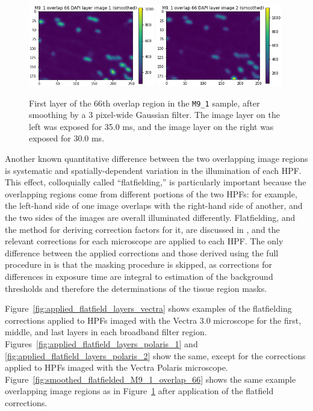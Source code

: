 \documentclass[letterpaper,11pt]{article}
\newcommand{\reffig}[1]{Figure~\ref{#1}}
\begin{document}
\begin{figure}[!ht]
\centering
\includegraphics[width=0.49\textwidth]{images/methods/smoothed_M9_1_overlap_66_dapi_image_1}
\includegraphics[width=0.49\textwidth]{images/methods/smoothed_M9_1_overlap_66_dapi_image_2}
\caption{\footnotesize First layer of the 66th overlap region in the \texttt{M9\_1} sample, after smoothing by a 3 pixel-wide Gaussian filter. The image layer on the left was exposed for 35.0 ms, and the image layer on the right was exposed for 30.0 ms.}
\label{fig:smoothed_M9_1_overlap_66}
\end{figure}

Another known quantitative difference between the two overlapping image regions is systematic and spatially-dependent variation in the illumination of each HPF. This effect, colloquially called ``flatfielding,'' is particularly important because the overlapping regions come from different portions of the two HPFs: for example, the left-hand side of one image overlaps with the right-hand side of another, and the two sides of the images are overall illuminated differently. Flatfielding, and the method for deriving correction factors for it, are discussed in \cite{flatfielding_note}, and the relevant corrections for each microscope are applied to each HPF. The only difference between the applied corrections and those derived using the full procedure in \cite{flatfielding_note} is that the masking procedure is skipped, as corrections for differences in exposure time are integral to estimation of the background thresholds and therefore the determinations of the tissue region masks. 

\reffig{fig:applied_flatfield_layers_vectra} shows examples of the flatfielding corrections applied to HPFs imaged with the Vectra 3.0 microscope for the first, middle, and last layers in each broadband filter region. Figures~\ref{fig:applied_flatfield_layers_polaris_1} and \ref{fig:applied_flatfield_layers_polaris_2} show the same, except for the corrections applied to HPFs imaged with the Vectra Polaris microscope. \reffig{fig:smoothed_flatfielded_M9_1_overlap_66} shows the same example overlapping image regions as in \reffig{fig:smoothed_M9_1_overlap_66} after application of the flatfield corrections.
\end{document}
